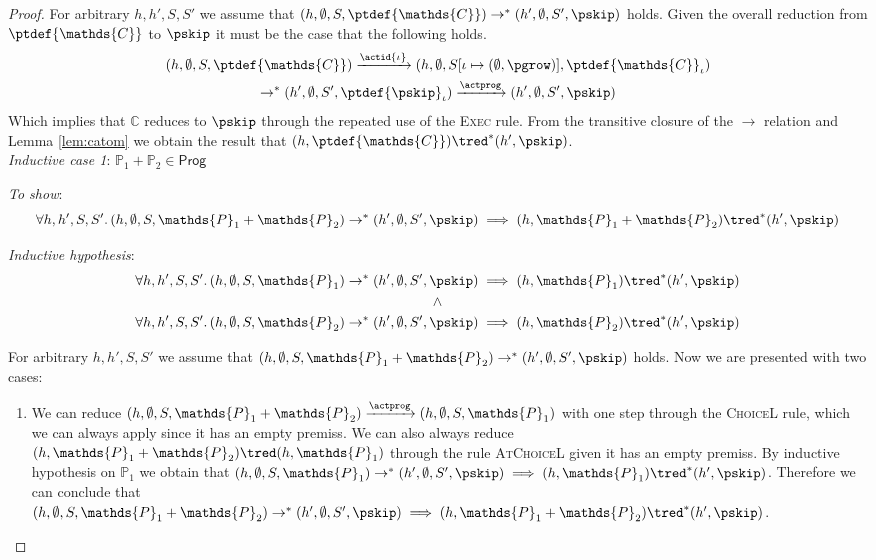 \begin{thm}
{\begin{proof}
For arbitrary $h, h', S, S'$ we assume that $(h, \emptyset, S, \ptdef{\mathds{C}}) \rightarrow^* (h', \emptyset, S', \pskip)$ holds. Given the overall reduction from $\ptdef{\mathds{C}}$ to $\pskip$ it must be the case that the following holds.
\begin{gather*}
	(h, \emptyset, S, \ptdef{\mathds{C}})
	\xrightarrow{\actid{\iota}} (h, \emptyset, S[\iota \mapsto (\emptyset, \pgrow)], \ptdef{\mathds{C}}_\iota) \\
	\rightarrow^* (h', \emptyset, S', \ptdef{\pskip}_\iota)
	\xrightarrow{\actprog} (h', \emptyset, S', \pskip)
\end{gather*}
Which implies that $\mathds{C}$ reduces to $\pskip$ through the repeated use of the \textsc{Exec} rule. From the transitive closure of the $\rightarrow$ relation and Lemma \ref{lem:catom} we obtain the result that $(h, \ptdef{\mathds{C}}) \tred^* (h', \pskip)$. \\

\textit{Inductive case 1}: $\mathds{P}_1 + \mathds{P}_2 \in \mathsf{Prog}$

\textit{To show}:
\[
	\forall h, h', S, S' \ldotp
	(h, \emptyset, S, \mathds{P}_1 + \mathds{P}_2) \rightarrow^* (h', \emptyset, S', \pskip) \implies 
	(h, \mathds{P}_1 + \mathds{P}_2 ) \tred^* (h', \pskip)
\]

\textit{Inductive hypothesis}:
\begin{gather*}
	\forall h, h', S, S' \ldotp
	(h, \emptyset, S, \mathds{P}_1) \rightarrow^* (h', \emptyset, S', \pskip) \implies 
	(h, \mathds{P}_1) \tred^* (h', \pskip)
	\\ \land \\
	\forall h, h', S, S' \ldotp
	(h, \emptyset, S, \mathds{P}_2) \rightarrow^* (h', \emptyset, S', \pskip) \implies 
	(h, \mathds{P}_2) \tred^* (h', \pskip)
\end{gather*}

For arbitrary $h, h', S, S'$ we assume that $(h, \emptyset, S, \mathds{P}_1 + \mathds{P}_2) \rightarrow^* (h', \emptyset, S', \pskip)$ holds. Now we are presented with two cases:
\begin{enumerate}
	\item We can reduce $(h, \emptyset, S, \mathds{P}_1 + \mathds{P}_2) \xrightarrow{\actprog} (h, \emptyset, S, \mathds{P}_1)$ with one step through the \textsc{ChoiceL} rule, which we can always apply since it has an empty premiss. We can also always reduce $(h, \mathds{P}_1 + \mathds{P}_2) \tred (h, \mathds{P}_1)$ through the rule \textsc{AtChoiceL} given it has an empty premiss. By inductive hypothesis on $\mathds{P}_1$ we obtain that $(h, \emptyset, S, \mathds{P}_1) \rightarrow^* (h', \emptyset, S', \pskip) \implies (h, \mathds{P}_1) \tred^* (h', \pskip)$. Therefore we can conclude that $(h, \emptyset, S, \mathds{P}_1 + \mathds{P}_2) \rightarrow^* (h', \emptyset, S', \pskip) \implies  (h, \mathds{P}_1 + \mathds{P}_2) \tred^* (h', \pskip)$.
	

\end{enumerate}
\end{proof}}
\end{thm}
